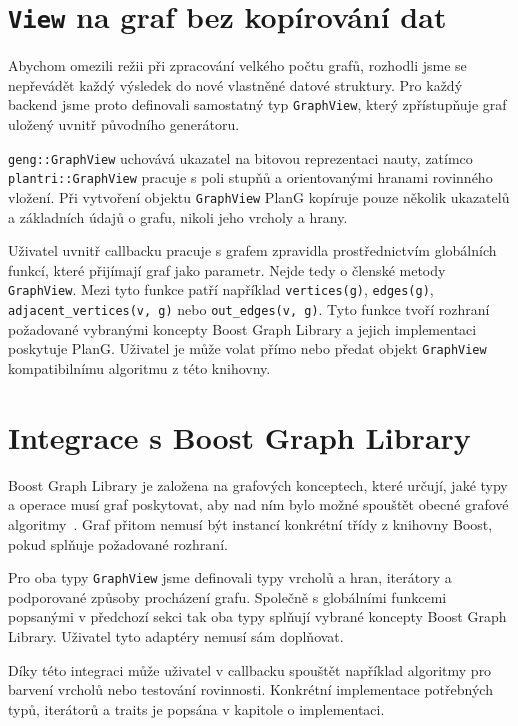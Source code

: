 \section{\texttt{View} na graf bez kopírování dat}
\label{sec:graph-view}



Abychom omezili režii při zpracování velkého počtu grafů, rozhodli jsme se
nepřevádět každý výsledek do nové vlastněné datové struktury. Pro každý backend
jsme proto definovali samostatný typ \texttt{GraphView}, který zpřístupňuje
graf uložený uvnitř původního generátoru.

\texttt{geng::GraphView} uchovává ukazatel na bitovou reprezentaci nauty,
zatímco \texttt{plantri::GraphView} pracuje s poli stupňů a orientovanými
hranami rovinného vložení. Při vytvoření objektu \texttt{GraphView} PlanG
kopíruje pouze několik ukazatelů a základních údajů o grafu, nikoli jeho
vrcholy a hrany.

Uživatel uvnitř callbacku pracuje s grafem zpravidla prostřednictvím
globálních funkcí, které přijímají graf jako parametr. Nejde tedy o členské
metody \texttt{GraphView}. Mezi tyto funkce patří například \texttt{vertices(g)},
\texttt{edges(g)},
\texttt{adjacent\_vertices(v, g)} nebo \texttt{out\_edges(v, g)}. Tyto funkce
tvoří rozhraní požadované vybranými koncepty Boost Graph Library a jejich
implementaci poskytuje PlanG. Uživatel je může volat přímo nebo předat objekt
\texttt{GraphView} kompatibilnímu algoritmu z této knihovny.



\section{Integrace s Boost Graph Library}
\label{sec:boost-integration}

Boost Graph Library je založena na grafových konceptech, které určují, jaké
typy a operace musí graf poskytovat, aby nad ním bylo možné spouštět obecné
grafové algoritmy~\cite{boostGraphConcepts}. Graf přitom nemusí být instancí
konkrétní třídy z knihovny Boost, pokud splňuje požadované rozhraní.

Pro oba typy \texttt{GraphView} jsme definovali typy vrcholů a hran, iterátory
a podporované způsoby procházení grafu. Společně s globálními funkcemi
popsanými v předchozí sekci tak oba typy splňují vybrané koncepty Boost Graph
Library. Uživatel tyto adaptéry nemusí sám doplňovat.

Díky této integraci může uživatel v callbacku spouštět například algoritmy pro
barvení vrcholů nebo testování rovinnosti. Konkrétní implementace potřebných
typů, iterátorů a traits je popsána v kapitole o implementaci.

